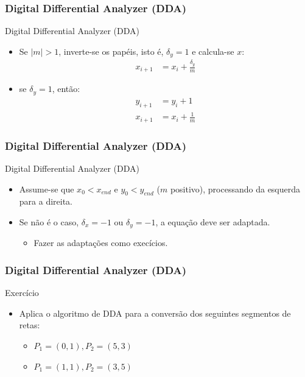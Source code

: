 \documentclass{beamer}
\begin{document}
\begin{frame}
\frametitle{Digital Differential Analyzer (DDA)}

		\begin{block}{Digital Differential Analyzer (DDA)}
		\begin{itemize}
			\item Se $|m| > 1$, inverte-se os papéis, isto é, $\delta_y = 1$ e calcula-se $x$:
			\begin{align*}
				x_{i+1}	&= x_i + \frac{\delta_y}{m}
			\end{align*}
			\item se $\delta_y=1$, então:
				\begin{align*}
					y_{i+1} &= y_i + 1 \\
					x_{i+1} &= x_i + \frac{1}{m}
				\end{align*}
		\end{itemize}
	\end{block}
\end{frame}

\begin{frame}
\frametitle{Digital Differential Analyzer (DDA)}

		\begin{block}{Digital Differential Analyzer (DDA)}
		\begin{itemize}
			\item Assume-se que $x_0 < x_{end}$ e $y_0 < y_{end}$ ($m$ positivo), processando da esquerda para a direita.
			\item Se não é o caso, $\delta_x=-1$ ou $\delta_y=-1$, a equação deve ser adaptada.
			\begin{itemize}
				\item Fazer as adaptações como execícios.
			\end{itemize}
		\end{itemize}
	\end{block}
\end{frame}

\begin{frame}
\frametitle{Digital Differential Analyzer (DDA)}

		\begin{block}{Exercício}
		\begin{itemize}
			\item Aplica o algoritmo de DDA para a conversão dos seguintes segmentos de retas:
				\begin{itemize}
					\item $P_1=(0,1),P_2=(5,3)$
					\item $P_1=(1,1),P_2=(3,5)$
				\end{itemize}
		\end{itemize}
	\end{block}
\end{frame}
\end{document}

